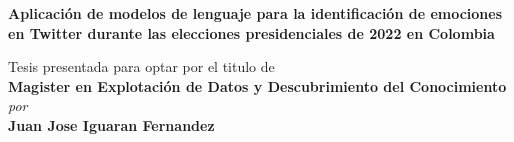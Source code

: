 \begin{titlepage}
\enlargethispage{3cm}

\begin{center}

\vspace*{-1cm}

\textbf{\Large Aplicación de modelos de lenguaje para la identificación de emociones en Twitter durante las elecciones presidenciales de 2022 en Colombia}\\[10pt]

\vspace*{0.5cm}


Tesis presentada para optar por el titulo de\\ 
\vspace*{0.5cm}
{\Large \bf Magister en Explotación de Datos y Descubrimiento del Conocimiento } \\





                      \vspace{10mm}
                   {\em  por} \\ \vspace{3mm}
             {\large \bf Juan Jose Iguaran Fernandez} \\


\vspace*{10mm}


\end{center}
\end{titlepage}
